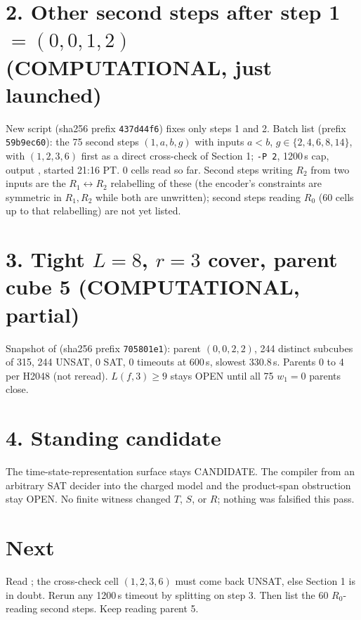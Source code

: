 \documentclass[11pt]{article}
\begin{document}
\section*{2. Other second steps after step 1 $=(0,0,1,2)$ (COMPUTATIONAL, just launched)}
New script  (sha256 prefix \texttt{437d44f6}) fixes only steps 1 and 2. Batch list  (prefix \texttt{59b9ec60}): the 75 second steps $(1,a,b,g)$ with inputs $a<b$, $g\in\{2,4,6,8,14\}$, with $(1,2,3,6)$ first as a direct cross-check of Section 1; \texttt{-P 2}, 1200\,s cap, output , started 21:16 PT. 0 cells read so far. Second steps writing $R_2$ from two inputs are the $R_1\leftrightarrow R_2$ relabelling of these (the encoder's constraints are symmetric in $R_1,R_2$ while both are unwritten); second steps reading $R_0$ (60 cells up to that relabelling) are not yet listed.

\section*{3. Tight $L=8$, $r=3$ cover, parent cube 5 (COMPUTATIONAL, partial)}
Snapshot  of  (sha256 prefix \texttt{705801e1}): parent $(0,0,2,2)$, 244 distinct subcubes of 315, 244 UNSAT, 0 SAT, 0 timeouts at 600\,s, slowest 330.8\,s. Parents 0 to 4 per H2048 (not reread). $L(f,3)\ge 9$ stays OPEN until all 75 $w_1=0$ parents close.

\section*{4. Standing candidate}
The time-state-representation surface stays CANDIDATE. The compiler from an arbitrary SAT decider into the charged model and the product-span obstruction stay OPEN. No finite witness changed $T$, $S$, or $R$; nothing was falsified this pass.

\section*{Next}
Read ; the cross-check cell $(1,2,3,6)$ must come back UNSAT, else Section 1 is in doubt. Rerun any 1200\,s timeout by splitting on step 3. Then list the 60 $R_0$-reading second steps. Keep reading parent 5.
\end{document}
